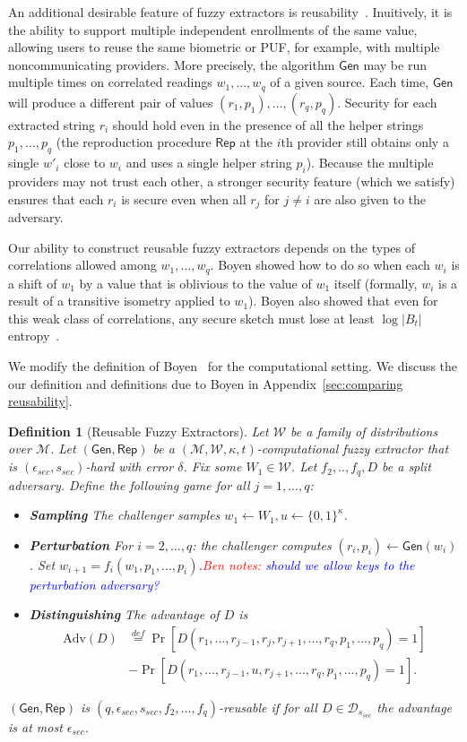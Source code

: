\documentclass[11pt]{article}
\newcommand{\apref}[1]{\mbox{Appendix~\ref{#1}}}
\newcommand{\class}[1]{{\ensuremath{\mathsf{#1}}}}
\newcommand{\gen}{\ensuremath{\class{Gen}}\xspace}
\newcommand{\rep}{\ensuremath{\class{Rep}}\xspace}
\newcommand{\zo}{\ensuremath{\{0, 1\}}}
\newtheorem{definition}[theorem]{Definition}
\newcommand{\authnote}[2]{{\textcolor{red}{\textsf{#1 notes: }\textcolor{blue}{ #2}}\marginpar{\textcolor{red}{\textbf{!!!!!}}}}}
\newcommand{\authnote}[2]{}
\newcommand{\bnote}[1]{{\authnote{Ben}{#1}}}
\begin{document}
An additional desirable feature of fuzzy extractors is reusability~\cite{Boyen2004}. Inuitively, it is the ability to support multiple independent enrollments of the same value, allowing users to reuse the same biometric or PUF, for example, with multiple noncommunicating providers. More precisely, the algorithm $\gen$ may be run multiple times on correlated readings $w_1,..., w_q$ of a given source. Each time, $\gen$ will produce a different pair of values $(r_1, p_1),..., (r_q, p_q)$. Security for each extracted string $r_i$ should hold even in the presence of all the helper strings $p_1, \dots, p_q$ (the reproduction procedure $\rep$ at the $i$th provider still obtains only a single $w'_i$ close to $w_i$ and uses a single helper string $p_i$). Because the multiple providers may not trust each other, a stronger security feature (which we satisfy) ensures that each $r_i$ is secure even when all $r_j$ for $j\neq i$ are also given to the adversary.

 Our ability to construct reusable fuzzy extractors depends on the types of correlations allowed among $w_1, \dots, w_q$. Boyen \cite{Boyen2004} showed how to do so when each $w_i$ is a shift of $w_1$ by a value that is oblivious to the value of $w_1$ itself (formally, $w_i$ is a result of a transitive isometry applied to $w_1$). Boyen also showed that even for this weak class of correlations, any secure sketch must lose at least $\log |B_t|$ entropy~\cite[Theorem 11]{Boyen2004}.
  

We modify the definition of Boyen~\cite[Definition 6]{Boyen2004} for the computational setting.  We discuss the our definition and definitions due to Boyen in \apref{sec:comparing reusability}.

\begin{definition}[Reusable Fuzzy Extractors]
\label{def:outsider fuzz ext}
Let $\mathcal{W}$ be a family of distributions over $\mathcal{M}$.  Let $(\gen, \rep)$ be a $(\mathcal{M}, \mathcal{W}, \kappa, t)$-computational fuzzy extractor that is $(\epsilon_{sec}, s_{sec})$-hard with error $\delta$.
Fix some $W_1 \in \mathcal{W}$.  Let $f_2,.., f_q , D$ be a split adversary.  Define the following game for all $j=1,..., q$:
\begin{itemize}%
\item \textbf{Sampling} The challenger samples $w_1\leftarrow W_1, u\leftarrow \zo^\kappa$.
\item \textbf{Perturbation} For $i=2,..., q$: the challenger computes $(r_i, p_i)\leftarrow \gen(w_i)$.  Set $w_{i+1} = f_i(w_1, p_1,..., p_i)$.\bnote{should we allow keys to the perturbation adversary?}
\item \textbf{Distinguishing} The advantage of $D$ is
\begin{align*}
\text{Adv}(D)&\overset{def}= \Pr[D(r_1,..., r_{j-1}, r_j, r_{j+1},..., r_q, p_1,..., p_q)=1]\\ &- \Pr[D(r_1,..., r_{j-1}, u, r_{j+1},..., r_q, p_1,..., p_q)=1].
\end{align*}
\end{itemize}
$(\gen, \rep)$ is $(q, \epsilon_{sec}, s_{sec}, f_2,..., f_q)$-reusable if for all $D\in\mathcal{D}_{s_{sec}}$ the advantage is at most $\epsilon_{sec}$.
\end{definition}
\end{document}

